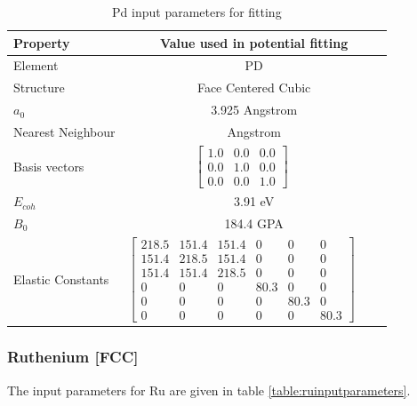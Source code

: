 \begin{table}[ht]
\renewcommand{\arraystretch}{1.2}
\begin{tabular}{lccc}
\hline\hline
Property & \multicolumn{3}{c}{Value used in potential fitting} \\
\hline\hline
Element & \multicolumn{3}{c}{PD}\\
Structure             & \multicolumn{3}{c}{Face Centered Cubic}\\
$a_0$                 & \multicolumn{3}{c}{3.925 Angstrom \cite{webelementspd}}\\
Nearest Neighbour     & \multicolumn{3}{c}{ Angstrom \cite{webelementspd}}\\
Basis vectors         & $\begin{bmatrix} 1.0 & 0.0 & 0.0 \\ 0.0 & 1.0 & 0.0 \\ 0.0 & 0.0 & 1.0  \end{bmatrix}$ \\
$E_{coh}$             & \multicolumn{3}{c}{3.91 eV \cite{semiempiricalpots}}   \\
$B_0$                 & \multicolumn{3}{c}{184.4 GPA \cite{semiempiricalpots}}   \\
Elastic Constants     & $\begin{bmatrix} 218.5 & 151.4 & 151.4 & 0 & 0 & 0 \\ 151.4 & 218.5 & 151.4 & 0 & 0 & 0 \\ 151.4 & 151.4 & 218.5 & 0 & 0 & 0 \\ 0 & 0 & 0 & 80.3 & 0 & 0 \\ 0 & 0 & 0 & 0 & 80.3 & 0 \\ 0 & 0 & 0 & 0 & 0 & 80.3 \end{bmatrix}$ \\
\hline\hline
\end{tabular}
\caption{Pd input parameters for fitting}
\label{table:pdinputparameters}
\end{table}

\FloatBarrier
\subsubsection{Ruthenium [FCC]}

The input parameters for Ru are given in table \ref{table:ruinputparameters}. 

